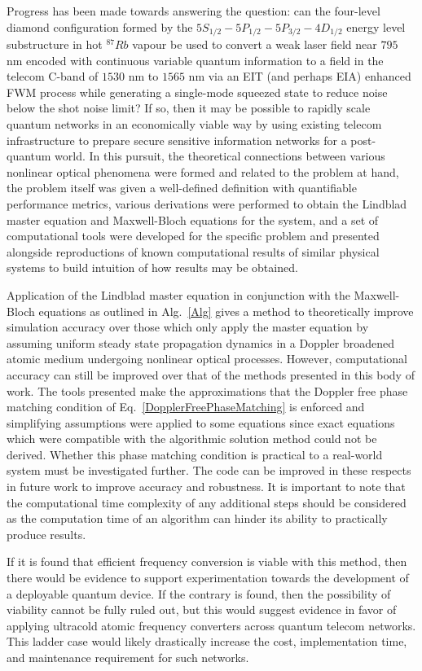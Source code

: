 \documentclass[aps,pra,showpacs,amsmath,amssymb,nofootinbib,longbibliography,superscriptaddress
]{revtex4-1}
\theoremstyle{definition}
\theoremstyle{remark}
\newcommand{\0}{\hat{0}}
\begin{document}
Progress has been made towards answering the question: can the four-level diamond configuration formed by the $5S_{1/2} - 5P_{1/2} - 5P_{3/2} - 4D_{1/2}$ energy level substructure in hot $^{87}Rb$ vapour be used to convert a weak laser field near $795$ nm encoded with continuous variable quantum information to a field in the telecom C-band of $1530$ nm to $1565$ nm via an EIT (and perhaps EIA) enhanced FWM process while generating a single-mode squeezed state to reduce noise below the shot noise limit? If so, then it may be possible to rapidly scale quantum networks in an economically viable way by using existing telecom infrastructure to prepare secure sensitive information networks for a post-quantum world. In this pursuit, the theoretical connections between various nonlinear optical phenomena were formed and related to the problem at hand, the problem itself was given a well-defined definition with quantifiable performance metrics, various derivations were performed to obtain the Lindblad master equation and Maxwell-Bloch equations for the system, and a set of computational tools were developed for the specific problem and presented alongside reproductions of known computational results of similar physical systems to build intuition of how results may be obtained.

Application of the Lindblad master equation in conjunction with the Maxwell-Bloch equations as outlined in Alg.~\ref{Alg} gives a method to theoretically improve simulation accuracy over those which only apply the master equation by assuming uniform steady state propagation dynamics in a Doppler broadened atomic medium undergoing nonlinear optical processes. However, computational accuracy can still be improved over that of the methods presented in this body of work. The tools presented make the approximations that the Doppler free phase matching condition of Eq.~\eqref{DopplerFreePhaseMatching} is enforced and simplifying assumptions were applied to some equations since exact equations which were compatible with the algorithmic solution method could not be derived. Whether this phase matching condition is practical to a real-world system must be investigated further. The code can be improved in these respects in future work to improve accuracy and robustness. It is important to note that the computational time complexity of any additional steps should be considered as the computation time of an algorithm can hinder its ability to practically produce results.

If it is found that efficient frequency conversion is viable with this method, then there would be evidence to support experimentation towards the development of a deployable quantum device. If the contrary is found, then the possibility of viability cannot be fully ruled out, but this would suggest evidence in favor of applying ultracold atomic frequency converters across quantum telecom networks. This ladder case would likely drastically increase the cost, implementation time, and maintenance requirement for such networks.
\end{document}
